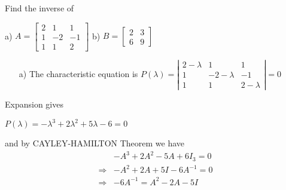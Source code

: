 \documentclass[11pt]{amsbook}
\begin{document}
	\begin{exmp} Find the inverse of
		\begin{center}
			 a) $A=\begin{bmatrix}2 & 1 & 1\\1 & -2 & -1\\1 & 1 & 2\end{bmatrix}$ \quad\quad b)  $B=\begin{bmatrix}2 & 3\\6 & 9\end{bmatrix}$
		\end{center}
	\end{exmp}
	\hNewLine
	\begin{hSolution}
		\begin{center}
		\begin{itemize}
			\item[a)] The characteristic equation is
			\hNewLine
			$P(\lambda)=\left| \begin{array}{ccc} 2-\lambda & 1 & 1\\1 & -2-\lambda & -1\\1 & 1 & 2-\lambda \end{array}\right|=0$
		\end{itemize}
		\end{center}
	\end{hSolution}

\hNewLine
Expansion gives
\hNewLine
	\begin{center}
		$P(\lambda)=-\lambda^3+2\lambda^2+5\lambda-6=0$
	\end{center}
\hNewLine
and by CAYLEY-HAMILTON Theorem we have
\hNewLine
\begin{align*}
	&-A^3+2A^2-5A+6I_3=0\\
	\Rightarrow &-A^2+2A+5I-6A^{-1}=0\\
	\Rightarrow  &-6A^{-1}=A^2-2A-5I\\
\end{align*}
\end{document}
